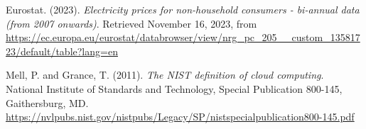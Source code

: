 \documentclass{llncs}
\begin{document}

\begin{thebibliography}{5}
  
  Eurostat. (2023). \textit{Electricity prices for non-household consumers - bi-annual data (from 2007 onwards)}. Retrieved November 16, 2023, from \url{https://ec.europa.eu/eurostat/databrowser/view/nrg_pc_205__custom_13581723/default/table?lang=en}
  
  Mell, P. and Grance, T. (2011).
  \emph{The NIST definition of cloud computing}.
  National Institute of Standards and Technology, Special Publication 800-145, Gaithersburg, MD.
  \url{https://nvlpubs.nist.gov/nistpubs/Legacy/SP/nistspecialpublication800-145.pdf}
  
\end{thebibliography}
\end{document}
